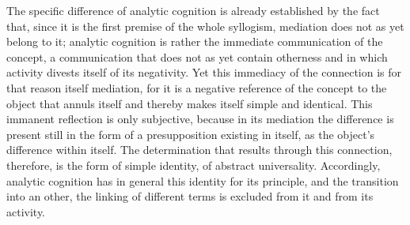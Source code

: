 The specific difference of analytic cognition is
already established by the fact that,
since it is the first premise of the whole syllogism,
mediation does not as yet belong to it;
analytic cognition is rather
the immediate communication of the concept,
a communication that does not as yet contain otherness
and in which activity divests itself of its negativity.
Yet this immediacy of the connection is
for that reason itself mediation,
for it is a negative reference of the concept to
the object that annuls itself
and thereby makes itself simple and identical.
This immanent reflection is only subjective,
because in its mediation the difference is
present still in the form of a presupposition
existing in itself,
as the object's difference within itself.
The determination that results
through this connection, therefore,
is the form of simple identity,
of abstract universality.
Accordingly, analytic cognition has in general
this identity for its principle,
and the transition into an other,
the linking of different terms is
excluded from it and from its activity.

